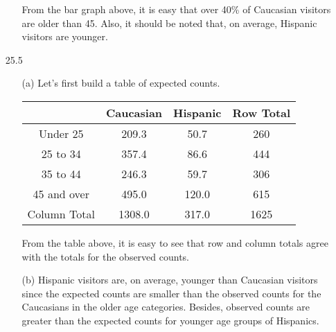 \documentclass[11pt, a4paper]{article}
\begin{document}
\begin{itemize}
\begin{itemize}
\item[]
\item[]
From the bar graph above, it is easy that
over 40\% of Caucasian visitors are older than 45.
Also, it should be noted that, on average, Hispanic visitors are younger.
\end{itemize}

\newpage

\item[25.5]
\begin{itemize}
\item[(a)]
Let's first build a table of expected counts.
\begin{center}
    \begin{tabular}{ |c|c|c|c| }
    \hline
     & Caucasian & Hispanic & Row Total\\
    \hline
    Under 25     & 209.3  & 50.7  & 260\\
    25 to 34     & 357.4  & 86.6  & 444\\
    35 to 44     & 246.3  & 59.7  & 306\\
    45 and over  & 495.0  & 120.0 & 615\\
    \hline
    Column Total & 1308.0 & 317.0 & 1625\\
    \hline
    \end{tabular}
\end{center}
\item[]
From the table above, it is easy to see
that row and column totals agree with the
totals for the observed counts.

\item[]

\item[(b)]
Hispanic visitors are, on average,
younger than Caucasian visitors
since the expected counts are smaller
than the observed counts for the Caucasians
in the older age categories.
Besides, observed counts are greater than
the expected counts for younger age
groups of Hispanics.
\end{itemize}


\end{itemize}
\end{document}
